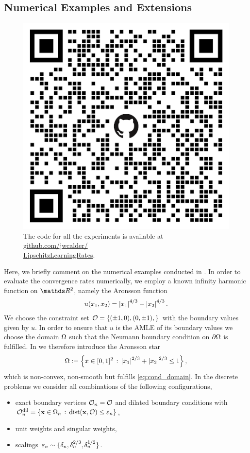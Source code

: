 \subsection{Numerical Examples and Extensions}
%
\begin{figure}
\centering
\includegraphics[width=.4\textwidth]{atelier/SSL/QR.png}
The code for all the experiments is available at \href{https://github.com/jwcalder/LipschitzLearningRates}{github.com/jwcalder/}\\
\href{https://github.com/jwcalder/LipschitzLearningRates}{LipschitzLearningRates}.
\end{figure}
%
Here, we briefly comment on the numerical examples conducted in \cite{bungert2021uniform}. In order to evaluate the convergence rates numerically, we employ a known infinity harmonic function on $\R^2$, namely the Aronsson function
%
\begin{align*}
u(x_1,x_2) = \left|x_1\right|^{4/3} - \left|x_2\right|^{4/3}.
\end{align*}
%
We choose the constraint set $\mathcal{O} = \{(\pm 1,0),(0,\pm 1),\}$ with the boundary values given by $u$. In order to ensure that $u$ is the AMLE of its boundary values we choose the domain $\Omega$ such that the Neumann boundary condition on $\partial\Omega$ is fulfilled. In \cite{bungert2021uniform} we therefore introduce the Aronsson star
%
\begin{align*}
\Omega:=\left\{x\in[0,1]^2 \,:\, \left|x_1\right|^{2/3}+\left|x_2\right|^{2/3}\leq 1\right\},
\end{align*}
%
which is non-convex, non-smooth but fulfills \cref{eq:cond_domain}. In the discrete problems we consider all combinations of the following configurations,
%
\begin{itemize}
\item exact boundary vertices $\mathcal{O}_n = \mathcal{O}$ and dilated boundary conditions with $\mathcal{O}_n^\text{dil} = \{\mathbf{x}\in\Omega_n \,:\, \text{dist}(\mathbf{x},\mathcal{O})\leq \varepsilon_n\}$,
\item unit weights and singular weights,
\item scalings $\varepsilon_n\sim\{\delta_n,\delta_n^{2/3},\delta_n^{1/2}\}$.
\end{itemize}
